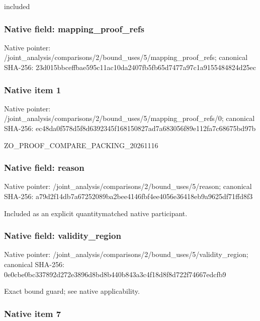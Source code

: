 \documentclass[10pt,a4paper]{article}
\begin{document}
included


\subsubsection{Native field: mapping\_proof\_refs}


Native pointer: /joint\_analysis/comparis\allowbreak{}ons/2/bound\_uses/5/mappi\allowbreak{}ng\_proof\_refs; canonical SHA-256: 23d015bbceffbae595c11ac1\allowbreak{}0da2407fb5fb65d7477a97c1\allowbreak{}a9155484824d25ec



\subsubsection{Native item 1}


Native pointer: /joint\_analysis/comparis\allowbreak{}ons/2/bound\_uses/5/mappi\allowbreak{}ng\_proof\_refs/0; canonical SHA-256: ec48da0f578d5f8d6392345f\allowbreak{}168150827ad7a683056f89e1\allowbreak{}12fa7c68675bd97b


ZO\_PROOF\_COMPARE\_PACKING\_20261116


\subsubsection{Native field: reason}


Native pointer: /joint\_analysis/comparis\allowbreak{}ons/2/bound\_uses/5/reaso\allowbreak{}n; canonical SHA-256: a79d2f14db7a67252089ba2b\allowbreak{}ee4146fbf4ee4056e36418eb\allowbreak{}9a9625df71ffd8f3


Included as an explicit quantitymatched native participant.


\subsubsection{Native field: validity\_region}


Native pointer: /joint\_analysis/comparis\allowbreak{}ons/2/bound\_uses/5/valid\allowbreak{}ity\_region; canonical SHA-256: 0e0cbe0bc337892d272e3896\allowbreak{}d8bd8b440b843a3c4f18d8f8\allowbreak{}d722f74667edcfb9


Exact bound guard; see native applicability.


\subsubsection{Native item 7}
\end{document}
